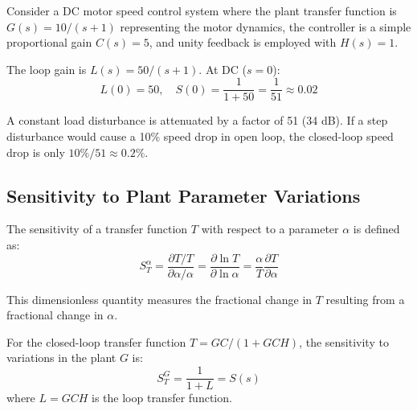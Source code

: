 \begin{example}
Consider a DC motor speed control system where the plant transfer function is $G(s) = 10/(s+1)$ representing the motor dynamics, the controller is a simple proportional gain $C(s) = 5$, and unity feedback is employed with $H(s) = 1$.

The loop gain is $L(s) = 50/(s+1)$. At DC ($s = 0$):
\begin{equation}
L(0) = 50, \quad S(0) = \frac{1}{1+50} = \frac{1}{51} \approx 0.02
\end{equation}

A constant load disturbance is attenuated by a factor of 51 (34 dB). If a step disturbance would cause a 10\% speed drop in open loop, the closed-loop speed drop is only $10\%/51 \approx 0.2\%$.
\end{example}

\subsection{Sensitivity to Plant Parameter Variations}

\begin{definition}
The sensitivity of a transfer function $T$ with respect to a parameter $\alpha$ is defined as:
\begin{equation}
S^\alpha_T = \frac{\partial T / T}{\partial \alpha / \alpha} = \frac{\partial \ln T}{\partial \ln \alpha} = \frac{\alpha}{T} \frac{\partial T}{\partial \alpha}
\end{equation}
\end{definition}

This dimensionless quantity measures the fractional change in $T$ resulting from a fractional change in $\alpha$.

\begin{theorem}
For the closed-loop transfer function $T = GC/(1+GCH)$, the sensitivity to variations in the plant $G$ is:
\begin{equation}
S^G_T = \frac{1}{1 + L} = S(s)
\label{eq:sensitivity_reduction}
\end{equation}
where $L = GCH$ is the loop transfer function.
\end{theorem}

